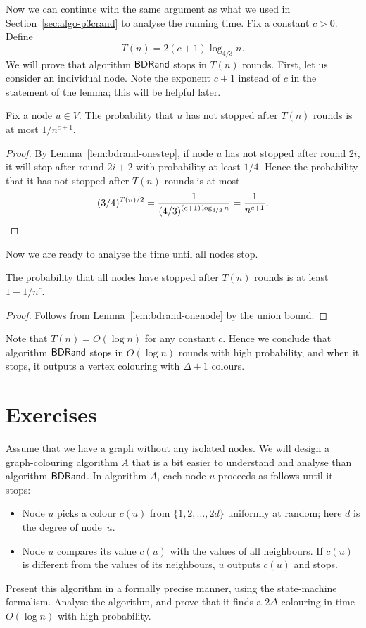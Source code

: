 Now we can continue with the same argument as what we used in Section~\ref{sec:algo-p3crand} to analyse the running time. Fix a constant $c > 0$. Define
\[
    T(n) = 2(c+1) \log_{4/3} n.
\]
We will prove that algorithm $\textup{\sffamily BDRand}$ stops in $T(n)$ rounds. First, let us consider an individual node. Note the exponent $c+1$ instead of $c$ in the statement of the lemma; this will be helpful later.

\begin{lemma}\label{lem:bdrand-onenode}
    Fix a node $u \in V$. The probability that $u$ has not stopped after $T(n)$ rounds is at most $1/n^{c+1}$.
\end{lemma}
\begin{proof}
    By Lemma~\ref{lem:bdrand-onestep}, if node $u$ has not stopped after round $2i$, it will stop after round $2i+2$ with probability at least $1/4$. Hence the probability that it has not stopped after $T(n)$ rounds is at most
    \[
        (3/4)^{T(n)/2} = \frac{1}{(4/3)^{(c+1) \log_{4/3} n}} = \frac{1}{n^{c+1}}. \qedhere
    \]
\end{proof}

Now we are ready to analyse the time until all nodes stop.

\begin{theorem}\label{thm:bdrand}
    The probability that all nodes have stopped after $T(n)$ rounds is at least $1 - 1/n^c$.
\end{theorem}
\begin{proof}
    Follows from Lemma~\ref{lem:bdrand-onenode} by the union bound.
\end{proof}

Note that $T(n) = O(\log n)$ for any constant $c$. Hence we conclude that algorithm $\textup{\sffamily BDRand}$ stops in $O(\log n)$ rounds with high probability, and when it stops, it outputs a vertex colouring with $\Delta+1$ colours.


\section{Exercises}

\begin{ex}\label{ex:bdrand2delta}
    Assume that we have a graph without any isolated nodes. We will design a graph-colouring algorithm $A$ that is a bit easier to understand and analyse than algorithm $\textup{\sffamily BDRand}$. In algorithm $A$, each node $u$ proceeds as follows until it stops:
    \begin{itemize}
        \item Node $u$ picks a colour $c(u)$ from $\{1,2,\dotsc,2d\}$ uniformly at random; here $d$ is the degree of node~$u$.
        \item Node $u$ compares its value $c(u)$ with the values of all neighbours. If $c(u)$ is different from the values of its neighbours, $u$ outputs $c(u)$ and stops.
    \end{itemize}
    Present this algorithm in a formally precise manner, using the state-machine formalism. Analyse the algorithm, and prove that it finds a $2\Delta$-colouring in time $O(\log n)$ with high probability.
\end{ex}

